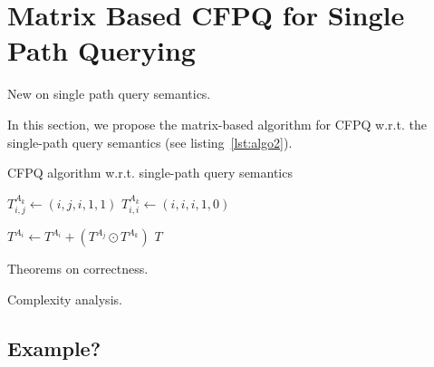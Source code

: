 \section{Matrix Based CFPQ for Single Path Querying}

New on single path query semantics.

In this section, we propose the matrix-based algorithm for CFPQ w.r.t. the single-path query semantics (see listing~\ref{lst:algo2}).
{\small
	\begin{algorithm}
		\begin{algorithmic}[1]
			\caption{CFPQ algorithm w.r.t. single-path query semantics}
			\label{lst:algo2}
			{$T^{A_k}_{i,j} \gets (i,j,i,1,1)$}
			\EndFor
			{$T^{A_k}_{i,i} \gets (i,i,i,1,0)$}
			\EndFor
			
			{ $T^{A_i} \gets T^{A_i} + (T^{A_j} \odot T^{A_k})$ } 
			\EndFor
			\EndWhile
			\State \Return $T$
			\EndFunction
		\end{algorithmic}
	\end{algorithm}
}

Theorems on correctness.

Complexity analysis.

\subsection{Example?}
